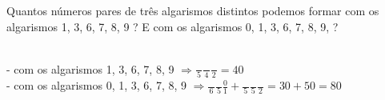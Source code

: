 \begin{ex}
 Quantos números pares de três algarismos distintos podemos formar com os algarismos 1, 3, 6, 7, 8, 9 ? 
E com os algarismos 0, 1, 3, 6, 7, 8, 9, ?
  \begin{sol}
   \phantom{A}  \\
   - com os algarismos 1, 3, 6, 7, 8, 9  $\Longrightarrow\frac{\phantom{A}}{5}\frac{\phantom{A}}{4}\frac{\phantom{A}}{2}=40$ \\
   - com os algarismos 0, 1, 3, 6, 7, 8, 9
   $\Longrightarrow\frac{\phantom{A}}{6}\frac{\phantom{A}}{5}\frac{0}{1}+\frac{\phantom{A}}{5}\frac{\phantom{A}}{5}\frac{\phantom{A}}{2}=30+50=80$   
  \end{sol}
\end{ex}